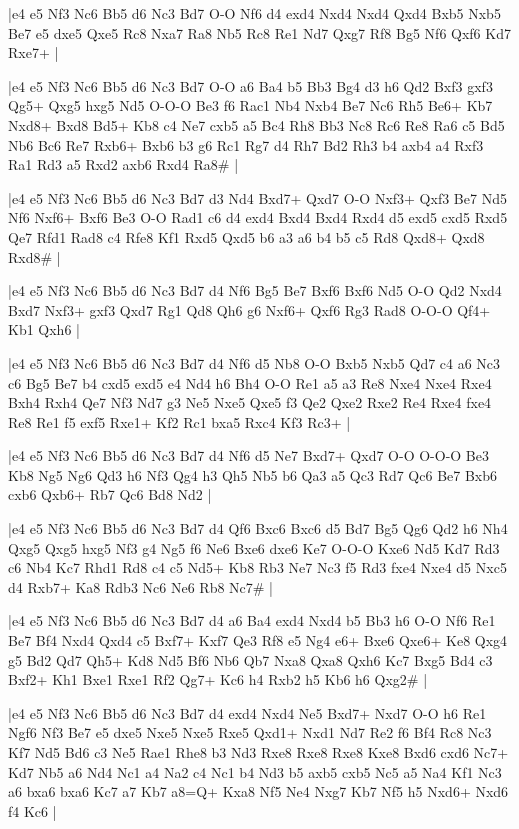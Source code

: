 \whitename{}
\blackname{}
\makegametitle
|e4 e5 Nf3 Nc6 Bb5 d6 Nc3 Bd7 O-O Nf6 d4 exd4 Nxd4 Nxd4 Qxd4 Bxb5 Nxb5 Be7 e5 dxe5 Qxe5 Rc8 Nxa7 Ra8 Nb5 Rc8 Re1 Nd7 Qxg7 Rf8 Bg5 Nf6 Qxf6 Kd7 Rxe7+  |

\whitename{}
\blackname{}
\makegametitle
|e4 e5 Nf3 Nc6 Bb5 d6 Nc3 Bd7 O-O a6 Ba4 b5 Bb3 Bg4 d3 h6 Qd2 Bxf3 gxf3 Qg5+ Qxg5 hxg5 Nd5 O-O-O Be3 f6 Rac1 Nb4 Nxb4 Be7 Nc6 Rh5 Be6+ Kb7 Nxd8+ Bxd8 Bd5+ Kb8 c4 Ne7 cxb5 a5 Bc4 Rh8 Bb3 Nc8 Rc6 Re8 Ra6 c5 Bd5 Nb6 Bc6 Re7 Rxb6+ Bxb6 b3 g6 Rc1 Rg7 d4 Rh7 Bd2 Rh3 b4 axb4 a4 Rxf3 Ra1 Rd3 a5 Rxd2 axb6 Rxd4 Ra8\#  |

\whitename{}
\blackname{}
\makegametitle
|e4 e5 Nf3 Nc6 Bb5 d6 Nc3 Bd7 d3 Nd4 Bxd7+ Qxd7 O-O Nxf3+ Qxf3 Be7 Nd5 Nf6 Nxf6+ Bxf6 Be3 O-O Rad1 c6 d4 exd4 Bxd4 Bxd4 Rxd4 d5 exd5 cxd5 Rxd5 Qe7 Rfd1 Rad8 c4 Rfe8 Kf1 Rxd5 Qxd5 b6 a3 a6 b4 b5 c5 Rd8 Qxd8+ Qxd8 Rxd8\#  |

\whitename{}
\blackname{}
\makegametitle
|e4 e5 Nf3 Nc6 Bb5 d6 Nc3 Bd7 d4 Nf6 Bg5 Be7 Bxf6 Bxf6 Nd5 O-O Qd2 Nxd4 Bxd7 Nxf3+ gxf3 Qxd7 Rg1 Qd8 Qh6 g6 Nxf6+ Qxf6 Rg3 Rad8 O-O-O Qf4+ Kb1 Qxh6  |

\whitename{}
\blackname{}
\makegametitle
|e4 e5 Nf3 Nc6 Bb5 d6 Nc3 Bd7 d4 Nf6 d5 Nb8 O-O Bxb5 Nxb5 Qd7 c4 a6 Nc3 c6 Bg5 Be7 b4 cxd5 exd5 e4 Nd4 h6 Bh4 O-O Re1 a5 a3 Re8 Nxe4 Nxe4 Rxe4 Bxh4 Rxh4 Qe7 Nf3 Nd7 g3 Ne5 Nxe5 Qxe5 f3 Qe2 Qxe2 Rxe2 Re4 Rxe4 fxe4 Re8 Re1 f5 exf5 Rxe1+ Kf2 Rc1 bxa5 Rxc4 Kf3 Rc3+  |

\whitename{}
\blackname{}
\makegametitle
|e4 e5 Nf3 Nc6 Bb5 d6 Nc3 Bd7 d4 Nf6 d5 Ne7 Bxd7+ Qxd7 O-O O-O-O Be3 Kb8 Ng5 Ng6 Qd3 h6 Nf3 Qg4 h3 Qh5 Nb5 b6 Qa3 a5 Qc3 Rd7 Qc6 Be7 Bxb6 cxb6 Qxb6+ Rb7 Qc6 Bd8 Nd2  |

\whitename{}
\blackname{}
\makegametitle
|e4 e5 Nf3 Nc6 Bb5 d6 Nc3 Bd7 d4 Qf6 Bxc6 Bxc6 d5 Bd7 Bg5 Qg6 Qd2 h6 Nh4 Qxg5 Qxg5 hxg5 Nf3 g4 Ng5 f6 Ne6 Bxe6 dxe6 Ke7 O-O-O Kxe6 Nd5 Kd7 Rd3 c6 Nb4 Kc7 Rhd1 Rd8 c4 c5 Nd5+ Kb8 Rb3 Ne7 Nc3 f5 Rd3 fxe4 Nxe4 d5 Nxc5 d4 Rxb7+ Ka8 Rdb3 Nc6 Ne6 Rb8 Nc7\#  |

\whitename{}
\blackname{}
\makegametitle
|e4 e5 Nf3 Nc6 Bb5 d6 Nc3 Bd7 d4 a6 Ba4 exd4 Nxd4 b5 Bb3 h6 O-O Nf6 Re1 Be7 Bf4 Nxd4 Qxd4 c5 Bxf7+ Kxf7 Qe3 Rf8 e5 Ng4 e6+ Bxe6 Qxe6+ Ke8 Qxg4 g5 Bd2 Qd7 Qh5+ Kd8 Nd5 Bf6 Nb6 Qb7 Nxa8 Qxa8 Qxh6 Kc7 Bxg5 Bd4 c3 Bxf2+ Kh1 Bxe1 Rxe1 Rf2 Qg7+ Kc6 h4 Rxb2 h5 Kb6 h6 Qxg2\#  |

\whitename{}
\blackname{}
\makegametitle
|e4 e5 Nf3 Nc6 Bb5 d6 Nc3 Bd7 d4 exd4 Nxd4 Ne5 Bxd7+ Nxd7 O-O h6 Re1 Ngf6 Nf3 Be7 e5 dxe5 Nxe5 Nxe5 Rxe5 Qxd1+ Nxd1 Nd7 Re2 f6 Bf4 Rc8 Nc3 Kf7 Nd5 Bd6 c3 Ne5 Rae1 Rhe8 b3 Nd3 Rxe8 Rxe8 Rxe8 Kxe8 Bxd6 cxd6 Nc7+ Kd7 Nb5 a6 Nd4 Nc1 a4 Na2 c4 Nc1 b4 Nd3 b5 axb5 cxb5 Nc5 a5 Na4 Kf1 Nc3 a6 bxa6 bxa6 Kc7 a7 Kb7 a8=Q+ Kxa8 Nf5 Ne4 Nxg7 Kb7 Nf5 h5 Nxd6+ Nxd6 f4 Kc6  |

